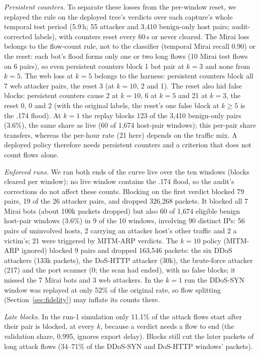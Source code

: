 \emph{Persistent counters.} To separate these losses from the per-window reset, we replayed the rule on the deployed tree's verdicts over each capture's whole temporal test period (5.9\,h; 55 attacker and 3,410 benign-only host pairs; audit-corrected labels), with counters reset every 60\,s or never cleared. The Mirai loss belongs to the flow-count rule, not to the classifier (temporal Mirai recall 0.90) or the reset: each bot's flood forms only one or two long flows (10 Mirai test flows on 6 pairs), so even persistent counters block 1 bot pair at $k=3$ and none from $k=5$. The web loss at $k=5$ belongs to the harness: persistent counters block all 7 web attacker pairs, the reset 3 (at $k=10$, 2 and 1). The reset also hid false blocks: persistent counters cause 2 at $k=10$, 6 at $k=5$ and 21 at $k=3$, the reset 0, 0 and 2 (with the original labels, the reset's one false block at $k\ge5$ is the .174 flood). At $k=1$ the replay blocks 123 of the 3,410 benign-only pairs (3.6\%), the same share as live (60 of 1,674 host-pair windows); this per-pair share transfers, whereas the per-hour rate (21 here) depends on the traffic mix. A deployed policy therefore needs persistent counters and a criterion that does not count flows alone.

\emph{Enforced runs.} We ran both ends of the curve live over the ten windows (blocks cleared per window); no live window contains the .174 flood, so the audit's corrections do not affect these counts. Blocking on the first verdict blocked 79 pairs, 19 of the 26 attacker pairs, and dropped 326,268 packets. It blocked all 7 Mirai bots (about 100k packets dropped) but also 60 of 1,674 eligible benign host-pair windows (3.6\%) in 9 of the 10 windows, involving 90 distinct IPs: 56 pairs of uninvolved hosts, 2 carrying an attacker host's other traffic and 2 a victim's; 21 were triggered by MITM-ARP verdicts. The $k=10$ policy (MITM-ARP ignored) blocked 9 pairs and dropped 163,546 packets: the six DDoS attackers (133k packets), the DoS-HTTP attacker (30k), the brute-force attacker (217) and the port scanner (0; the scan had ended), with no false blocks; it missed the 7 Mirai bots and 3 web attackers. In the $k=1$ run the DDoS-SYN window was replayed at only 52\% of the original rate, so flow splitting (Section~\ref{sec:fidelity}) may inflate its counts there.

\emph{Late blocks.} In the run-1 simulation only 11.1\% of the attack flows start after their pair is blocked, at every $k$, because a verdict needs a flow to end (the validation share, 0.995, ignores export delay). Blocks still cut the later packets of long attack flows (34--71\% of the DDoS-SYN and DoS-HTTP windows' packets).

